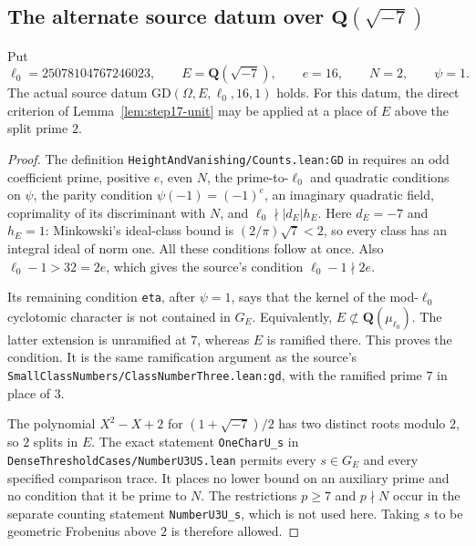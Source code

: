 \subsection{The alternate source datum over \(\mathbf Q(\sqrt{-7})\)}
\label{sec:minus7-source-coverage}

\begin{lemma}\label{lem:minus7-source}
Put
\[
 \ell_0=25078104767246023,\qquad E=\mathbf Q(\sqrt{-7}),
 \qquad e=16,\qquad N=2,\qquad\psi=1.
\]
The actual source datum \(\mathrm{GD}(\Omega,E,\ell_0,16,1)\) holds.
For this datum, the direct criterion of
Lemma~\ref{lem:step17-unit} may be applied at a place of \(E\) above
the split prime \(2\).
\end{lemma}

\begin{proof}
The definition \texttt{HeightAndVanishing/Counts.lean:GD} in
\cite{K17PinnedLeanMirror} requires an odd coefficient prime, positive
\(e\), even \(N\), the prime-to-\(\ell_0\) and quadratic conditions on
\(\psi\), the parity condition \(\psi(-1)=(-1)^e\), an imaginary
quadratic field, coprimality of its discriminant with \(N\), and
\(\ell_0\nmid |d_E|h_E\). Here \(d_E=-7\) and \(h_E=1\): Minkowski's
ideal-class bound is \((2/\pi)\sqrt7<2\), so every class has an integral
ideal of norm one. All these conditions follow at once. Also
\(\ell_0-1>32=2e\), which gives the source's condition
\(\ell_0-1\nmid2e\).

Its remaining condition \texttt{eta}, after \(\psi=1\), says that the
kernel of the mod-\(\ell_0\) cyclotomic character is not contained in
\(G_E\). Equivalently, \(E\not\subset\mathbf Q(\mu_{\ell_0})\).
The latter extension is unramified at \(7\), whereas \(E\) is ramified
there. This proves the condition. It is the same ramification argument
as the source's \texttt{SmallClassNumbers/ClassNumberThree.lean:gd},
with the ramified prime \(7\) in place of \(3\).

The polynomial \(X^2-X+2\) for
\((1+\sqrt{-7})/2\) has two distinct roots modulo \(2\), so \(2\)
splits in \(E\). The exact statement \texttt{OneCharU\_s} in
\texttt{DenseThresholdCases/NumberU3US.lean} permits every
\(s\in G_E\) and every specified comparison trace. It places no lower
bound on an auxiliary prime and no condition that it be prime to \(N\).
The restrictions \(p\ge7\) and \(p\nmid N\) occur in the separate
counting statement \texttt{NumberU3U\_s}, which is not used here.
Taking \(s\) to be geometric Frobenius above \(2\) is therefore allowed.
\end{proof}

